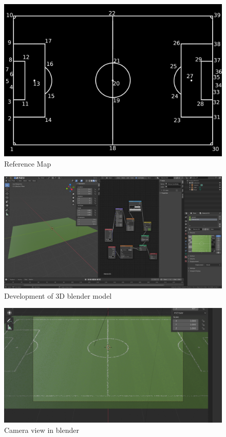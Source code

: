 \documentclass[
    11pt,
    oneside
]{report}
\begin{document}
\begin{appendices}
\begin{figure}[H]
    \includegraphics[keepaspectratio, width=\columnwidth]{coordinates.png}
    \caption{Reference Map}
    \label{img:ref_map}
\end{figure}

\begin{figure}[H]
    \includegraphics[keepaspectratio, width=\columnwidth]{Screenshot_from_2021-10-22_13-59-52.png}
    \caption{Development of 3D blender model}
    \label{img:texture}
\end{figure}


\begin{figure}[H]
    \includegraphics[keepaspectratio, width=\columnwidth]{Screenshot_2021-12-17_19-08-06.png}
    \caption{Camera view in blender}
    \label{img:cam_grass}
\end{figure}



\end{appendices}
\end{document}
